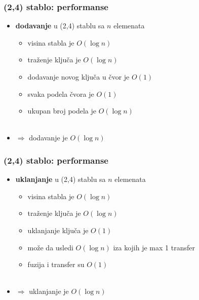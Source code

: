 \documentclass[compress]{beamer}
\begin{document}
\begin{frame}[fragile]
  \frametitle{(2,4) stablo: performanse}
  \begin{itemize}
    \item \textbf{dodavanje} u (2,4) stablu sa $n$ elemenata
    \begin{itemize}
      \item visina stabla je $O(\log n)$
      \item traženje ključa je $O(\log n)$
      \item dodavanje novog ključa u čvor je $O(1)$
      \item svaka podela čvora je $O(1)$
      \item ukupan broj podela je $O(\log n)$ \\ \ \\
    \end{itemize}
    \item $\Rightarrow$ dodavanje je $O(\log n)$ 
  \end{itemize}
\end{frame}

\begin{frame}[fragile]
  \frametitle{(2,4) stablo: performanse}
  \begin{itemize}
    \item \textbf{uklanjanje} u (2,4) stablu sa $n$ elemenata
    \begin{itemize}
      \item visina stabla je $O(\log n)$
      \item traženje ključa je $O(\log n)$
      \item uklanjanje ključa je $O(1)$
      \item može da usledi $O(\log n)$ iza kojih je max 1 transfer
      \item fuzija i transfer su $O(1)$ \\ \ \\
    \end{itemize}
    \item $\Rightarrow$ uklanjanje je $O(\log n)$ 
  \end{itemize}
\end{frame}
\end{document}
